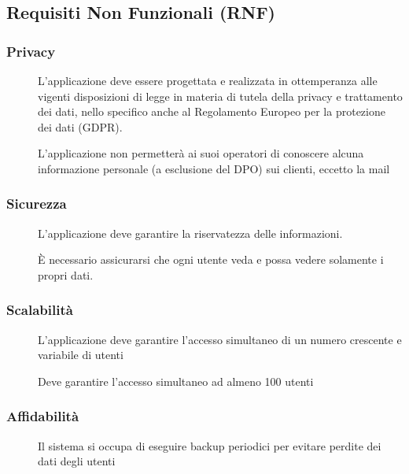 \documentclass{article}
\begin{document}
\subsection{Requisiti Non Funzionali (RNF)}
\renewcommand\thesubsubsection{RNF\arabic{subsubsection}}
\subsubsection{Privacy} \label{rnf_1}
\begin{description}
    \item[] L’applicazione deve essere progettata e realizzata in ottemperanza alle vigenti disposizioni di legge in materia di tutela della privacy e trattamento dei dati, nello specifico anche al Regolamento Europeo per la protezione dei dati (GDPR).
    \item[] L’applicazione non permetterà ai suoi operatori di conoscere alcuna informazione personale (a esclusione del DPO) sui clienti, eccetto la mail
\end{description}
\subsubsection{Sicurezza} \label{rnf_2}
\begin{description}
    \item[] L’applicazione deve garantire la riservatezza delle informazioni.
    \item[] È necessario assicurarsi che ogni utente veda e possa vedere solamente i propri dati.
\end{description}
\subsubsection{Scalabilità} \label{rnf_3}
\begin{description}
    \item[] L'applicazione deve garantire l'accesso simultaneo di un numero crescente e variabile di utenti
    \item[] Deve garantire l'accesso simultaneo ad almeno 100 utenti
\end{description}
\subsubsection{Affidabilità} \label{rnf_4}
\begin{description}
    \item[] Il sistema si occupa di eseguire backup periodici per evitare perdite dei dati degli utenti
\end{description}
\end{document}
